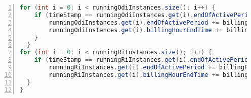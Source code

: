 \begin{lstlisting}[language=java,caption=AppElastic Scaledown,label=list:appelasticscaledown,numbers=left,frame=single,fontadjust=true,breaklines]
  for (int i = 0; i < runningOdiInstances.size(); i++) {
  	if (timeStamp == runningOdiInstances.get(i).endOfActivePeriod && runningOdiInstances.get(i).canExtend) {
  		runningOdiInstances.get(i).endOfActivePeriod += billingPeriod;
  		runningOdiInstances.get(i).billingHourEndTime += billingPeriod;
  	}
  }
for (int i = 0; i < runningRiInstances.size(); i++) {
	if (timeStamp == runningRiInstances.get(i).endOfActivePeriod) {
		runningRiInstances.get(i).endOfActivePeriod += billingPeriod;
		runningRiInstances.get(i).billingHourEndTime += billingPeriod;
  }
}
\end{lstlisting}
